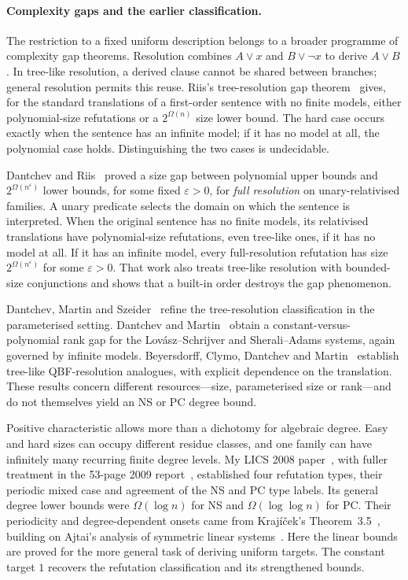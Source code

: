 \documentclass[11pt,a4paper]{article}
\theoremstyle{definition}\newtheorem{definition}[theorem]{Definition}
\theoremstyle{remark}\newtheorem{remark}[theorem]{Remark}
\begin{document}
\paragraph{Complexity gaps and the earlier classification.}
The restriction to a fixed uniform description belongs to a broader
programme of complexity gap theorems. Resolution combines
$A\lor x$ and $B\lor\neg x$ to derive $A\lor B$. In tree-like
resolution, a derived clause cannot be shared between branches;
general resolution permits this reuse. Riis's tree-resolution gap
theorem~\cite{RiisTree} gives, for the standard translations of a
first-order sentence with no finite models, either polynomial-size
refutations or a $2^{\Omega(n)}$ size lower bound. The hard case occurs
exactly when the sentence has an infinite model; if it has no model
at all, the polynomial case holds. Distinguishing the two cases is
undecidable.

Dantchev and Riis~\cite{DantchevRiis} proved a size gap between
polynomial upper bounds and $2^{\Omega(n^\varepsilon)}$ lower bounds,
for some fixed $\varepsilon>0$, for \emph{full resolution} on
unary-relativised families. A unary predicate selects the domain on which the sentence
is interpreted. When the original sentence has no finite models, its
relativised translations have polynomial-size refutations, even
tree-like ones, if it has no model at all. If it has an infinite model,
every full-resolution refutation has size
$2^{\Omega(n^\varepsilon)}$ for some $\varepsilon>0$. That work also
treats tree-like resolution with bounded-size conjunctions and shows
that a built-in order destroys the gap phenomenon.

Dantchev, Martin and Szeider~\cite{DMS} refine the tree-resolution
classification in the parameterised setting. Dantchev and
Martin~\cite{DMRank} obtain a constant-versus-polynomial rank gap for
the Lov\'asz--Schrijver and Sherali--Adams systems, again governed by
infinite models. Beyersdorff, Clymo, Dantchev and Martin~\cite{QBFGap}
establish tree-like QBF-resolution analogues, with explicit dependence
on the translation. These results concern different resources---size,
parameterised size or rank---and do not themselves yield an NS or PC
degree bound.

Positive characteristic allows more than a dichotomy for algebraic
degree. Easy and hard sizes can occupy different residue classes, and
one family can have infinitely many recurring finite degree levels.
My LICS 2008 paper~\cite[Theorems~1 and~10]{Riis}, with fuller treatment
in the 53-page 2009 report~\cite{RiisLong}, established four refutation types,
their periodic mixed case and agreement of the NS and PC type labels.
Its general degree lower bounds were $\Omega(\log n)$ for NS and
$\Omega(\log\log n)$ for PC. Their periodicity and degree-dependent
onsets came from Kraj\'i\v cek's Theorem~3.5~\cite{Krajicek}, building
on Ajtai's analysis of symmetric linear systems~\cite{Ajtai}.
Here the linear bounds are proved for
the more general task of deriving uniform targets. The constant
target $1$ recovers the refutation classification and its strengthened
bounds.
\end{document}
